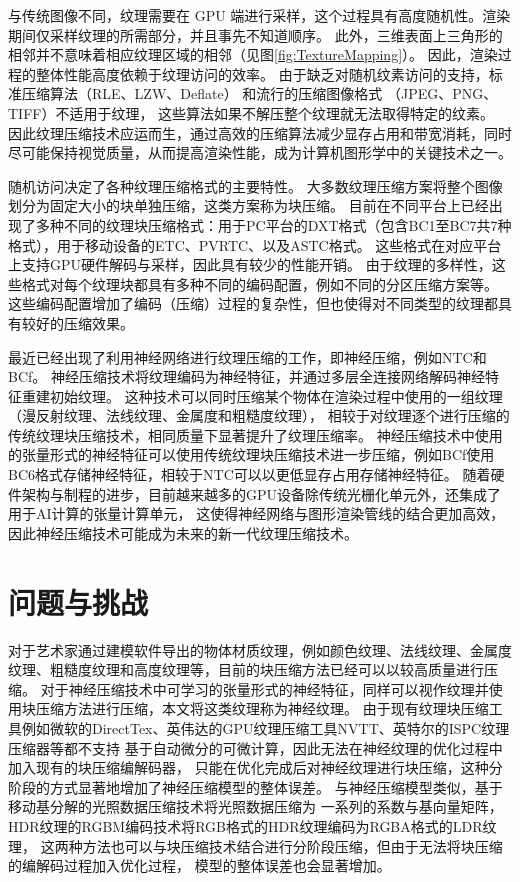 与传统图像不同，纹理需要在 GPU 端进行采样，这个过程具有高度随机性。渲染期间仅采样纹理的所需部分，并且事先不知道顺序。
此外，三维表面上三角形的相邻并不意味着相应纹理区域的相邻（见图\ref{fig:TextureMapping}）。
因此，渲染过程的整体性能高度依赖于纹理访问的效率。
由于缺乏对随机纹素访问的支持，标准压缩算法（RLE、LZW、Deflate） 和流行的压缩图像格式 （JPEG、PNG、TIFF）不适用于纹理，
这些算法如果不解压整个纹理就无法取得特定的纹素。
因此纹理压缩技术应运而生，通过高效的压缩算法减少显存占用和带宽消耗，同时尽可能保持视觉质量，从而提高渲染性能，成为计算机图形学中的关键技术之一。

随机访问决定了各种纹理压缩格式的主要特性。
大多数纹理压缩方案将整个图像划分为固定大小的块单独压缩，这类方案称为块压缩。
目前在不同平台上已经出现了多种不同的纹理块压缩格式：用于PC平台的DXT格式（包含BC1至BC7共7种格式），用于移动设备的ETC、PVRTC、以及ASTC格式。
这些格式在对应平台上支持GPU硬件解码与采样，因此具有较少的性能开销。
由于纹理的多样性，这些格式对每个纹理块都具有多种不同的编码配置，例如不同的分区压缩方案等。
这些编码配置增加了编码（压缩）过程的复杂性，但也使得对不同类型的纹理都具有较好的压缩效果。

最近已经出现了利用神经网络进行纹理压缩的工作，即神经压缩，例如NTC\cite{vaidyanathan2023random}和BCf\cite{weinreich2024real}。
神经压缩技术将纹理编码为神经特征，并通过多层全连接网络解码神经特征重建初始纹理。
这种技术可以同时压缩某个物体在渲染过程中使用的一组纹理（漫反射纹理、法线纹理、金属度和粗糙度纹理），
相较于对纹理逐个进行压缩的传统纹理块压缩技术，相同质量下显著提升了纹理压缩率。
神经压缩技术中使用的张量形式的神经特征可以使用传统纹理块压缩技术进一步压缩，例如BCf\cite{weinreich2024real}使用
BC6格式存储神经特征，相较于NTC\cite{vaidyanathan2023random}可以以更低显存占用存储神经特征。
随着硬件架构与制程的进步，目前越来越多的GPU设备除传统光栅化单元外，还集成了用于AI计算的张量计算单元，
这使得神经网络与图形渲染管线的结合更加高效，因此神经压缩技术可能成为未来的新一代纹理压缩技术。

\section{问题与挑战}

对于艺术家通过建模软件导出的物体材质纹理，例如颜色纹理、法线纹理、金属度纹理、粗糙度纹理和高度纹理等，目前的块压缩方法已经可以以较高质量进行压缩。
对于神经压缩技术中可学习的张量形式的神经特征，同样可以视作纹理并使用块压缩方法进行压缩，本文将这类纹理称为神经纹理。
由于现有纹理块压缩工具例如微软的DirectTex、英伟达的GPU纹理压缩工具NVTT、英特尔的ISPC纹理压缩器等都不支持
基于自动微分的可微计算，因此无法在神经纹理的优化过程中加入现有的块压缩编解码器，
只能在优化完成后对神经纹理进行块压缩，这种分阶段的方式显著地增加了神经压缩模型的整体误差。
与神经压缩模型类似，基于移动基分解的光照数据压缩技术\cite{silvennoinen2021moving}将光照数据压缩为
一系列的系数与基向量矩阵，HDR纹理的RGBM编码技术将RGB格式的HDR纹理编码为RGBA格式的LDR纹理，
这两种方法也可以与块压缩技术结合进行分阶段压缩，但由于无法将块压缩的编解码过程加入优化过程，
模型的整体误差也会显著增加。


